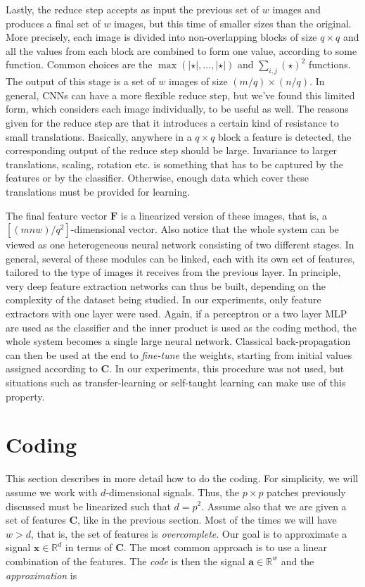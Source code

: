 \documentclass[runningheads,a4paper]{llncs}
\newcommand{\hctimes}[2]{{#1}\!\times\!{#2}}
\newcommand{\hcsignalspace}{\mathbb{R}^d}
\newcommand{\hcweightspace}{\mathbb{R}^w}
\begin{document}
Lastly, the reduce step accepts as input the previous set of $w$ images and produces a final set of $w$ images, but this time of smaller sizes than the original. More precisely, each image is divided into non-overlapping blocks of size $\hctimes{q}{q}$ and all the values from each block are combined to form one value, according to some function. Common choices are the $\max(\left|\star\right|,\dots,\left|\star\right|)$ and $\sum_{i,j}{(\star)^2}$ functions. The output of this stage is a set of $w$ images of size $\hctimes{(m / q)}{(n / q)}$. In general, CNNs can have a more flexible reduce step, but we've found this limited form, which considers each image individually, to be useful as well. The reasons given for the reduce step are that it introduces a certain kind of resistance to small translations. Basically, anywhere in a $\hctimes{q}{q}$ block a feature is detected, the corresponding output of the reduce step should be large. Invariance to larger translations, scaling, rotation etc. is something that has to be captured by the features or by the classifier. Otherwise, enough data which cover these translations must be provided for learning.

The final feature vector $\textbf{F}$ is a linearized version of these images, that is, a $\left[(mnw) / q^2\right]$-dimensional vector. Also notice that the whole system can be viewed as one heterogeneous neural network consisting of two different stages. In general, several of these modules can be linked, each with its own set of features, tailored to the type of images it receives from the previous layer. In principle, very deep feature extraction networks can thus be built, depending on the complexity of the dataset being studied. In our experiments, only feature extractors with one layer were used. Again, if a perceptron or a two layer MLP are used as the classifier and the inner product is used as the coding method, the whole system becomes a single large neural network. Classical back-propagation can then be used at the end to \emph{fine-tune} the weights, starting from initial values assigned according  to $\textbf{C}$. In our experiments, this procedure was not used, but situations such as transfer-learning or self-taught learning \cite{self-taught-learning} can make use of this property.

\section{Coding}

This section describes in more detail how to do the coding. For simplicity, we will assume we work with $d$-dimensional signals. Thus, the $\hctimes{p}{p}$ patches previously discussed must be linearized such that $d = p^2$. Assume also that we are given a set of features $\textbf{C}$, like in the previous section. Most of the times we will have $w > d$, that is, the set of features is \emph{overcomplete}. Our goal is to approximate a signal $\textbf{x} \in \hcsignalspace$ in terms of $\textbf{C}$. The most common approach is to use a linear combination of the features. The \emph{code} is then the signal $\textbf{a} \in \hcweightspace$ and the \emph{approximation} is
\end{document}
